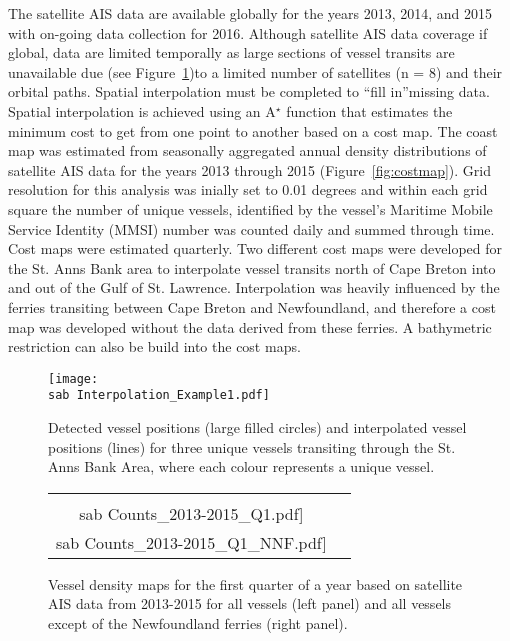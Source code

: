 \documentclass[letterpaper,portrait,11pt]{scrartcl}
\numberwithin{equation}{section}		%
\numberwithin{figure}{section}		%
\numberwithin{table}{section}				%
\newcommand{\ecomod}{\string~/ecomod_data/}   %
\newcommand{\sab}{\ecomod/mpa/sab/}   %
\begin{document}
The satellite AIS data are available globally for the years 2013, 2014, and 2015 with on-going data collection for 2016. Although satellite AIS data coverage if global, data are limited temporally as large sections of vessel transits are unavailable due (see Figure~\ref{fig:astar})to a limited number of satellites (n = 8) and their orbital paths.  Spatial interpolation must be completed to \textquotedblleft fill in\textquotedblright  missing data.  Spatial interpolation is achieved using an A$^{\star}$ function \parencite{hart1968formal} that estimates the minimum cost to get from one point to another based on a cost map.  The coast map was estimated from seasonally aggregated annual density distributions of satellite AIS data for the years 2013 through 2015 (Figure~\ref{fig:costmap}).  Grid resolution for this analysis was inially set to 0.01 degrees and within each grid square the number of unique vessels, identified by the vessel's Maritime Mobile Service Identity (MMSI) number was counted daily and summed through time.  Cost maps were estimated quarterly.  Two different cost maps were developed for the St. Anns Bank area to interpolate vessel transits north of Cape Breton into and out of the Gulf of St. Lawrence.  Interpolation was heavily influenced by the ferries transiting between Cape Breton and Newfoundland, and therefore a cost map was developed without the data derived from these ferries.  A bathymetric restriction can also be build into the cost maps.

\begin{figure}[h]
	\centering
	\texttt{[image: \\sab Interpolation\_Example1.pdf]}
	\caption{Detected vessel positions (large filled circles) and interpolated vessel positions (lines) for three unique vessels transiting through the St. Anns Bank Area, where each colour represents a unique vessel.}
	\label{fig:astar}
\end{figure}


\begin{figure}[h]

	\centering
	\begin{tabular}{cc}
		\texttt{[image: \\sab Counts\_2013-2015\_Q1.pdf]} &
		\texttt{[image: \\sab Counts\_2013-2015\_Q1\_NNF.pdf]}
	\end{tabular}
	\caption{Vessel density maps for the first quarter of a year based on satellite AIS data from 2013-2015 for all vessels (left panel) and all vessels except of the Newfoundland ferries (right panel).}
	\label{fig:countmaps}
\end{figure}
\end{document}
